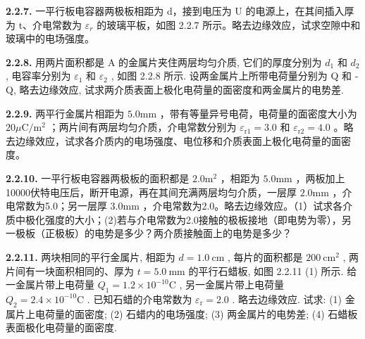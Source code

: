 \vfill
\newpage

\textbf{2.2.7.} 一平行板电容器两极板相距为 d，接到电压为 U 的电源上，在其间插入厚为 t、介电常数为 $\varepsilon_{r}$ 的玻璃平板，如图 2.2.7 所示。略去边缘效应，试求空隙中和玻璃中的电场强度。

\begin{center}
\end{center}

\vfill
\newpage

\textbf{2.2.8.} 用两片面积都是 A 的金属片夹住两层均匀介质, 它们的厚度分别为 $d_{1}$ 和 $d_{2}$ , 电容率分别为 $\varepsilon_{1}$ 和 $\varepsilon_{2}$ , 如图 2.2.8 所示. 设两金属片上所带电荷量分别为 Q 和 -Q, 略去边缘效应, 试求两介质表面上极化电荷量的面密度和两金属片的电势差.

\begin{center}
\end{center}

\vfill
\newpage

\textbf{2.2.9.} 两平行金属片相距为 $5.0\mathrm{mm}$ ，带有等量异号电荷，电荷量的面密度大小为 $20\mu \mathrm{C} / \mathrm{m}^2$ ；两片间有两层均匀介质，介电常数分别为 $\varepsilon_{\mathrm{r1}} = 3.0$ 和 $\varepsilon_{\mathrm{r2}} = 4.0$ 。略去边缘效应，试求各介质内的电场强度、电位移和介质表面上极化电荷量的面密度。

\vfill
\newpage

\textbf{2.2.10.} 一平行板电容器两极板的面积都是 $2.0\mathrm{m}^2$ ，相距为 $5.0\mathrm{mm}$ ，两板加上10000伏特电压后，断开电源，再在其间充满两层均匀介质，一层厚 $2.0\mathrm{mm}$ ，介电常数为5.0；另一层厚 $3.0\mathrm{mm}$ ，介电常数为2.0。略去边缘效应。（1）试求各介质中极化强度的大小；(2)若与介电常数为2.0接触的极板接地（即电势为零），另一极板（正极板）的电势是多少？两介质接触面上的电势是多少？

\vfill
\newpage

\textbf{2.2.11.} 两块相同的平行金属片, 相距为 $d = 1.0 \mathrm{~cm}$ , 每片的面积都是 $200 \mathrm{~cm}^{2}$ , 两片间有一块面积相同的、厚为 $t = 5.0 \mathrm{~mm}$ 的平行石蜡板, 如图 2.2.11 (1) 所示. 给一金属片带上电荷量 $Q_{1} = 1.2 \times 10^{-10} \mathrm{C}$ , 另一金属片带上电荷量 $Q_{2} = 2.4 \times 10^{-10} \mathrm{C}$ . 已知石蜡的介电常数为 $\varepsilon_{\mathrm{r}} = 2.0$ . 略去边缘效应. 试求: (1) 金属片上电荷量的面密度; (2) 石蜡内的电场强度; (3) 两金属片的电势差; (4) 石蜡板表面极化电荷量的面密度.

\begin{center}
\end{center}


